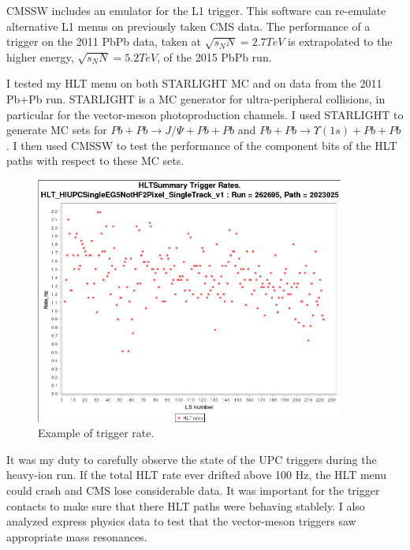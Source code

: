 CMSSW includes an emulator for the L1 trigger. This software can re-emulate alternative L1 menus on previously taken CMS data. The performance of a trigger on the 2011 PbPb data, taken at $\sqrt{s_NN} = 2.7 TeV$ is extrapolated to the higher energy, $\sqrt{s_NN} = 5.2 TeV$, of the 2015 PbPb run.

I tested my HLT menu on both STARLIGHT MC and on data from the 2011 Pb+Pb run. STARLIGHT is a MC generator for ultra-peripheral collisions, in particular for the vector-meson photoproduction channels. I used STARLIGHT to generate MC sets for $Pb+Pb\rightarrow J/\Psi+Pb+Pb$ and $Pb+Pb\rightarrow \Upsilon(1s)+Pb+Pb$. I then used CMSSW to test the performance of the component bits of the HLT paths with respect to these MC sets. 

\begin{figure}[h!]
\begin{centering}
\includegraphics[width=4in]{Chapter5/importfigs/triggerRateExample.png}
\par\end{centering}
\caption{Example of trigger rate. \label{fig:trigRate}}
\end{figure}

It was my duty to carefully observe the state of the UPC triggers during the heavy-ion run. If the total HLT rate ever drifted above 100 Hz, the HLT menu could crash and CMS lose considerable data. It was important for the trigger contacts to make sure that there HLT paths were behaving stablely. I also analyzed express physics data to test that the vector-meson triggers saw appropriate mass resonances.

